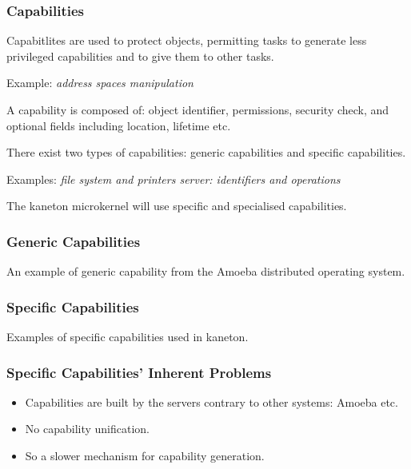 \begin{frame}
  \frametitle{Capabilities}

  Capabitlites are used to protect objects, permitting tasks to generate
  less privileged capabilities and to give them to other tasks.

  \-

  Example: \textit{address spaces manipulation}

  \-

  A capability is composed of: object identifier, permissions,
  security check, and optional fields including location, lifetime
  etc.

  \-

  There exist two types of capabilities: generic capabilities and
  \alert{specific} capabilities.

  \-

  Examples: \textit{file system and printers server: identifiers
    and operations}

  \-

  The kaneton microkernel will use specific and specialised capabilities.
\end{frame}


\begin{frame}
  \frametitle{Generic Capabilities}

  An example of generic capability from the Amoeba distributed operating
  system.

  \-

  \begin{center}
  \end{center}
\end{frame}


\begin{frame}
  \frametitle{Specific Capabilities}

  Examples of specific capabilities used in kaneton.

  \begin{center}
  \end{center}
\end{frame}


\begin{frame}
  \frametitle{Specific Capabilities' Inherent Problems}

  \begin{itemize}[<+->]
    \item
      Capabilities are built by the servers contrary to other systems:
      Amoeba etc.
    \item
      No capability unification.
    \item
      So a slower mechanism for capability generation.
  \end{itemize}
\end{frame}

